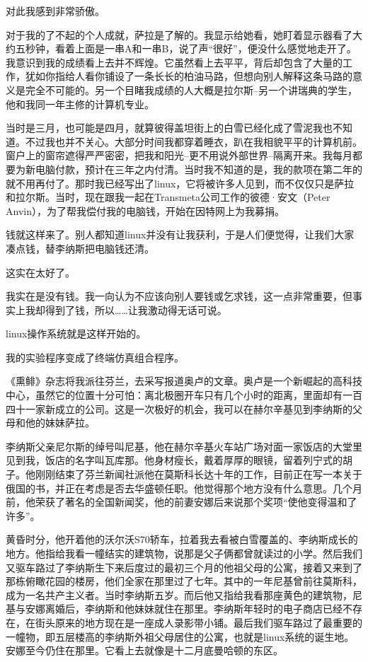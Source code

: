 对此我感到非常骄傲。

对于我的了不起的个人成就，萨拉是了解的。我显示给她看，她盯着显示器看了大约五秒钟，看着上面是一串A和一串B，说了声“很好”，便没什么感觉地走开了。我意识到我的成绩看上去并不辉煌。它虽然看上去平平，背后却包含了大量的工作，犹如你指给人看你铺设了一条长长的柏油马路，但想向别人解释这条马路的意义是完全不可能的。另一个目睹我成绩的人大概是拉尔斯--另一个讲瑞典的学生，他和我同一年主修的计算机专业。

当时是三月，也可能是四月，就算彼得盖坦街上的白雪已经化成了雪泥我也不知道。不过我也并不关心。大部分时间我都穿着睡衣，趴在我相貌平平的计算机前。窗户上的窗帘遮得严严密密，把我和阳光--更不用说外部世界--隔离开来。我每月都要为新电脑付款，预计在三年之内付清。当时我不知道的是，我的款项在第二年的就不用再付了。那时我已经写出了linux，它将被许多人见到，而不仅仅只是萨拉和拉尔斯。当时，现在跟我一起在Transmeta公司工作的彼德·安文（Peter Anvin），为了帮我偿付我的电脑钱，开始在因特网上为我募捐。

钱就这样来了。别人都知道linux并没有让我获利，于是人们便觉得，让我们大家凑点钱，替李纳斯把电脑钱还清。

这实在太好了。

我实在是没有钱。我一向认为不应该向别人要钱或乞求钱，这一点非常重要，但事实上我却得到了钱，所以……让我激动得无话可说。

linux操作系统就是这样开始的。

我的实验程序变成了终端仿真组合程序。

 

《熏鲱》杂志将我派往芬兰，去采写报道奥卢的文章。奥卢是一个新崛起的高科技中心，虽然它的位置十分可怕：离北极圈开车只有几个小时的距离，里面却有一百四十一家新成立的公司。这是一次极好的机会，我可以在赫尔辛基见到李纳斯的父母和他的妹妹萨拉。

李纳斯父亲尼尔斯的绰号叫尼基，他在赫尔辛基火车站广场对面一家饭店的大堂里见到我，饭店的名字叫瓦库那。他身材瘦长，戴着厚厚的眼镜，留着列宁式的胡子。他刚刚结束了芬兰新闻社派他在莫斯科长达十年的工作，目前正在写一本关于俄国的书，并正在考虑是否去华盛顿任职。他觉得那个地方没有什么意思。几个月前，他荣获了著名的全国新闻奖，他的前妻安娜后来说那个奖项“使他变得温和了许多”。

黄昏时分，他开着他的沃尔沃S70轿车，拉着我去看被白雪覆盖的、李纳斯成长的地方。他指给我看一幢结实的建筑物，说那是父子俩都曾就读过的小学。然后我们又驱车路过了李纳斯生下来后度过的最初三个月的他祖父母的公寓，接着又来到了那栋俯瞰花园的楼房，他们全家在那里过了七年。其中的一年尼基曾前往莫斯科，成为一名共产主义者。当时李纳斯五岁。而后他又指给我看那座黄色的建筑物，尼基与安娜离婚后，李纳斯和他妹妹就住在那里。李纳斯年轻时的电子商店已经不存在，在街头原来的地方现在是一座成人录影带小铺。最后我们驱车路过了最重要的一幢物，即五层楼高的李纳斯外祖父母居住的公寓，也就是linux系统的诞生地。安娜至今仍住在那里。它看上去就像是十二月底曼哈顿的东区。

